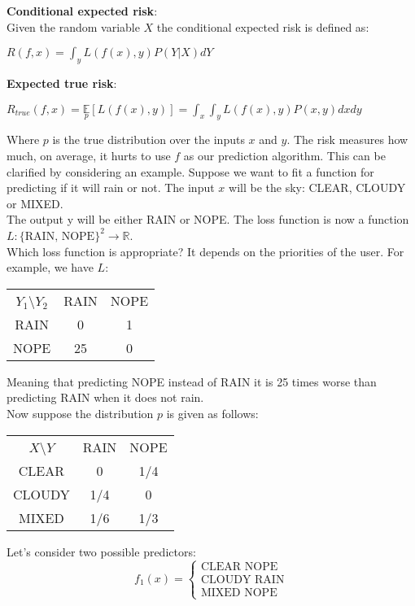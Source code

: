 \documentclass[twoside]{article}
\begin{document}
\textbf{Conditional expected risk}:\\
Given the random variable $X$ the conditional expected risk is defined as:
\begin{center}
    $R(f,x) = \int_y L(f(x), y)P(Y | X) dY$
\end{center}
\textbf{Expected true risk}:
\begin{center}
    $R_{true}(f,x) = \underset{p}{\mathbb{E}}[L(f(x), y)] = \int_x\int_y L(f(x), y)P(x, y) dx dy$
\end{center}
Where $p$ is the true distribution over the inputs $x$ and $y$. The risk measures how much, on average, it hurts to use $f$ as our prediction algorithm.
\newpage
This can be clarified by considering an example. Suppose we want to fit a function for predicting if it will rain or not. The input $x$ will be the sky: CLEAR, CLOUDY or MIXED.\\
The output y will be either RAIN or NOPE. The loss function is now a function $L : \{\text{RAIN, NOPE}\}^2 \rightarrow \mathbb{R}$.\\
Which loss function is appropriate? It depends on the priorities of the user. For example, we have $L$:
\begin{center}
\begin{tabular}{ |c|c|c| } 
 \hline
 $Y_1$\textbackslash $Y_2$ & RAIN & NOPE \\ 
 RAIN & 0 & 1 \\ 
 NOPE & 25 & 0 \\ 
 \hline
\end{tabular}
\end{center}
Meaning that predicting NOPE instead of RAIN it is 25 times worse than predicting RAIN when it does not rain.\\
Now suppose the distribution $p$ is given as follows:
\begin{center}
\begin{tabular}{ |c|c|c| } 
 \hline
 $X$\textbackslash $Y$ & RAIN & NOPE \\ 
 CLEAR & 0 & 1/4 \\ 
 CLOUDY & 1/4 & 0 \\ 
 MIXED & 1/6 & 1/3 \\ 
 \hline
\end{tabular}
\end{center}
Let's consider two possible predictors:
\begin{equation*}
    f_1(x) = \begin{cases}
        \text{CLEAR NOPE} \\
        \text{CLOUDY RAIN} \\
        \text{MIXED NOPE} 
    \end{cases}
\end{equation*}
\end{document}
